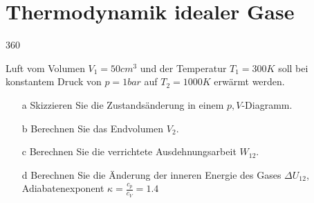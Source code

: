 \section{Thermodynamik idealer Gase}
\begin{auf}
    360
\end{auf}
Luft vom Volumen $V_1=50cm^3$ und der Temperatur $T_1=300K$ soll bei konstantem Druck	von $p=1bar$ auf $T_2=1000K$ erwärmt werden.
\begin{enumerate}
    \item[a] Skizzieren Sie die Zustandsänderung in einem $p,V$-Diagramm.
    \item[b] Berechnen Sie das Endvolumen $V_2$.
    \item[c] Berechnen Sie die verrichtete Ausdehnungsarbeit $W_{12}$.
    \item[d] Berechnen Sie die Änderung der inneren Energie des Gases $\Delta U_{12}$, Adiabatenexponent $\kappa=\frac{c_p}{c_V}=1.4$
\end{enumerate}